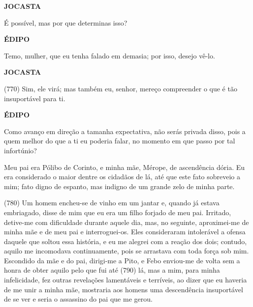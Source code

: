 \textbf{JOCASTA}

É possível, mas por que determinas isso?

\textbf{ÉDIPO}

Temo, mulher, que eu tenha falado em demasia; por isso, desejo vê-lo.

\textbf{JOCASTA}

(770) Sim, ele virá; mas também eu, senhor, mereço compreender o que é
tão insuportável para ti.

\textbf{ÉDIPO}

Como avanço em direção a tamanha expectativa, não serás privada disso,
pois a quem melhor do que a ti eu poderia falar, no momento em que passo
por tal infortúnio?

Meu pai era Pólibo de Corinto, e minha mãe, Mérope, de ascendência
dória. Eu era considerado o maior dentre os cidadãos de lá, até que este
fato sobreveio a mim; fato digno de espanto, mas indigno de um grande
zelo de minha parte.

(780) Um homem encheu-se de vinho em um jantar e, quando já estava
embriagado, disse de mim que eu era um filho forjado de meu pai.
Irritado, detive-me com dificuldade durante aquele dia, mas, no
seguinte, aproximei-me de minha mãe e de meu pai e interroguei-os. Eles
consideraram intolerável a ofensa daquele que soltou essa história, e eu
me alegrei com a reação dos dois; contudo, aquilo me incomodava
continuamente, pois se arrastava com toda força sob mim. Escondido da
mãe e do pai, dirigi-me a Pito, e Febo enviou-me de volta sem a honra de
obter aquilo pelo que fui até (790) lá, mas a mim, para minha
infelicidade, fez outras revelações lamentáveis e terríveis, ao dizer
que eu haveria de me unir a minha mãe, mostraria aos homens uma
descendência insuportável de se ver e seria o assassino do pai que me
gerou.

